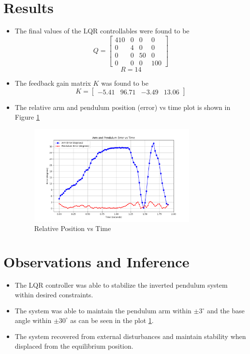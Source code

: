 \documentclass{article}
\begin{document}
\section{Results}

\begin{itemize}[nolistsep]
    \item The final values of the LQR controllables were found to be $$Q = \begin{bmatrix} 410 & 0 & 0 & 0 \\ 0 & 4 & 0 & 0 \\ 0 & 0 & 50 & 0 \\ 0 & 0 & 0 & 100 \end{bmatrix}$$ $$R = 14$$
    \vspace{-10pt}
    \item The feedback gain matrix $K$ was found to be $$K = \begin{bmatrix} -5.41 & 96.71 & -3.49 & 13.06 \end{bmatrix}$$
    \item The relative arm and pendulum position (error) vs time plot is shown in Figure \ref{fig:plot}
    \vspace{-10pt}
    \begin{figure}[!htb]
        \centering
        \includegraphics[width=0.8\textwidth]{../././inv_pendulum.png}
        \caption{Relative Position vs Time}
        \label{fig:plot}
    \end{figure}
\end{itemize}

\section{Observations and Inference}
\begin{itemize}[nolistsep]
    \item The LQR controller was able to stabilize the inverted pendulum system within desired constraints.
    \item The system was able to maintain the pendulum arm within $\pm 3^{\circ}$ and the base angle within $\pm 30^{\circ}$ as can be seen in the plot \ref{fig:plot}.
    \item The system recovered from external disturbances and maintain stability when displaced from the equilibrium position.
\end{itemize}


\end{document}
